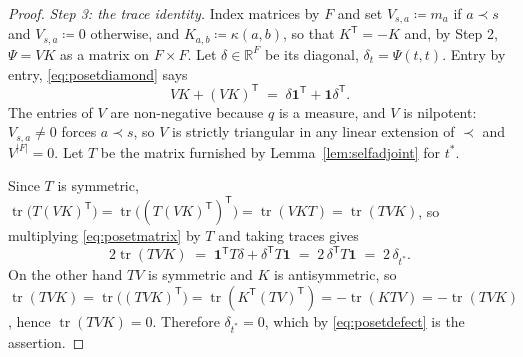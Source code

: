 \documentclass[11pt,a4paper]{article}
\theoremstyle{plain}
\theoremstyle{definition}
\theoremstyle{remark}
\newcommand{\R}{\mathbb{R}}
\newcommand{\one}{\mathbf{1}}
\begin{document}
\begin{proof}
  \emph{Step 3: the trace identity.}  Index matrices by $F$ and set
  $V_{s,a} \coloneqq m_a$ if $a \prec s$ and $V_{s,a} \coloneqq 0$ otherwise, and
  $K_{a,b} \coloneqq \kappa(a,b)$, so that $K^{\mathsf T} = -K$ and, by Step 2,
  $\Psi = VK$ as a matrix on $F \times F$.  Let $\delta \in \R^F$ be its
  diagonal, $\delta_t = \Psi(t,t)$.  Entry by entry, \eqref{eq:posetdiamond} says
  \begin{equation}
    \label{eq:posetmatrix}
    VK + (VK)^{\mathsf T} \;=\; \delta\one^{\mathsf T} + \one\delta^{\mathsf T} .
  \end{equation}
  The entries of $V$ are non-negative because $q$ is a measure, and $V$ is
  nilpotent: $V_{s,a} \neq 0$ forces $a \prec s$, so $V$ is strictly triangular
  in any linear extension of $\prec$ and $V^{|F|} = 0$.  Let $T$ be the matrix
  furnished by Lemma~\ref{lem:selfadjoint} for $t^*$.

  Since $T$ is symmetric,
  $\operatorname{tr}\bigl(T(VK)^{\mathsf T}\bigr)
   = \operatorname{tr}\bigl((T(VK)^{\mathsf T})^{\mathsf T}\bigr)
   = \operatorname{tr}(VKT) = \operatorname{tr}(TVK)$, so multiplying
  \eqref{eq:posetmatrix} by $T$ and taking traces gives
  \[
    2\operatorname{tr}(TVK)
      \;=\; \one^{\mathsf T}T\delta + \delta^{\mathsf T}T\one
      \;=\; 2\,\delta^{\mathsf T} T \one
      \;=\; 2\,\delta_{t^*} .
  \]
  On the other hand $TV$ is symmetric and $K$ is antisymmetric, so
  $\operatorname{tr}(TVK) = \operatorname{tr}\bigl((TVK)^{\mathsf T}\bigr)
   = \operatorname{tr}(K^{\mathsf T}(TV)^{\mathsf T})
   = -\operatorname{tr}(KTV) = -\operatorname{tr}(TVK)$, hence
  $\operatorname{tr}(TVK) = 0$.  Therefore $\delta_{t^*} = 0$, which by
  \eqref{eq:posetdefect} is the assertion.
\end{proof}
\end{document}
